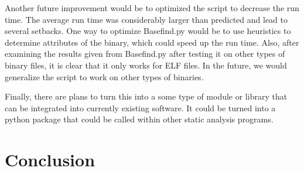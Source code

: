 \documentclass[letterpaper,twocolumn,10pt]{article}
\begin{document}
Another future improvement would be to optimized the script to decrease the run time. The average run time was considerably larger than predicted and lead to several setbacks. One way to optimize Basefind.py would be to use heuristics to determine attributes of the binary, which could speed up the run time. Also, after examining the results given from Basefind.py after testing it on other types of binary files, it is clear that it only works for ELF files. In the future, we would generalize the script to work on other types of binaries. 

Finally, there are plans to turn this into a some type of module or library that can be integrated into currently existing software. It could be turned into a python package that could be called within other static analysis programs. 

\section{Conclusion}



\end{document}

